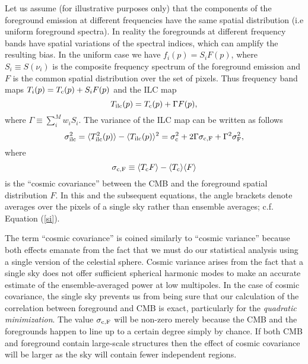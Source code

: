 \documentclass{emulateapj}
\def\cmb{{\rm c}}
\def\ilc{{\rm ilc}}
\def\fg{{\rm F}}
\begin{document}
Let us assume (for illustrative purposes only) that the components
of the foreground emission at different frequencies have the same
spatial distribution (i.e uniform foreground spectra). In reality
the foregrounds at different frequency bands have spatial variations
of the spectral indices, which can amplify the resulting bias. In
the uniform case we have $f_i(p) = S_i F(p)$, where $S_i \equiv
S(\nu_i)$ is the composite frequency spectrum of the foreground
emission and $F$ is the common spatial distribution over the set of
pixels. Thus frequency band maps $T_i(p)= T_\cmb(p) + S_i F(p)$ and the ILC map
\begin{equation}
T_\ilc(p) = T_\cmb(p) + \Gamma F(p),
\end{equation}
where $\Gamma \equiv \sum_i^M w_i S_i$. The variance of the ILC map can be written as follows
\citep{wmap3ytem}
\begin{equation}
\sigma_\ilc^2=\langle T_\ilc^2(p) \rangle - \langle T_\ilc(p)
\rangle^2 = \sigma_\cmb^2 +2 \Gamma \sigma_{\cmb, \fg} +\Gamma^2
\sigma_\fg^2, \label{combin}
\end{equation}
where 
\begin{equation}
\sigma_{\cmb, \fg}\equiv \langle T_\cmb F \rangle - \langle
T_\cmb \rangle\langle F\rangle 
\end{equation}
is the ``cosmic covariance''
between the CMB and the foreground spatial distribution $F$. In this
and the subsequent equations, the angle brackets denote averages
over the pixels of a single sky rather than ensemble averages; c.f.
Equation (\ref{si}).

The term ``cosmic covariance'' is coined similarly to ``cosmic
variance'' \citep{cosmicvariance} because both effects emanate from the fact that we must
do our statistical analysis using a single version of the celestial
sphere. Cosmic variance arises from the fact that a single sky does
not offer sufficient spherical harmonic modes to make an accurate
estimate of the ensemble-averaged power at low multipoles. In the case of cosmic covariance, the single sky prevents us from being sure that our
calculation of the correlation between foreground and CMB is
exact, particularly for the {\it quadratic minimization}. The value $\sigma_{\cmb, \fg}$ will be non-zero merely
because the CMB and the foregrounds happen to line up to a certain
degree simply by chance. If both CMB and foreground contain
large-scale structures then the effect of cosmic covariance will be
larger as the sky will contain fewer independent regions.
\end{document}
